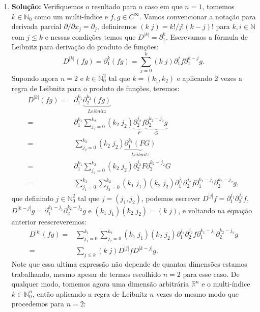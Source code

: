 \documentclass{article}
\begin{document}
\begin{enumerate}
		\item \textbf{Solução:} Verifiquemos o resultado para o caso em que $n =1$, tomemos $k \in \mathbb{N}_{0}$ como um multi-índice e $f, g \in C^{\infty}$. Vamos convencionar a notação para derivada parcial $\partial/\partial {x_{j}} = \partial_{j}$, definiremos $(k \; j) = k!/j!(k-j)!$ para $k, i \in \mathbb{N}$ com $j \leq k$  e nessas condições temos que $D^{|k|} = \partial^{k}_{1}$. Escrevamos a fórmula de Leibnitz para derivação do produto de funções:
		$$
		D^{|k|} (fg)
		= \partial^{k}_{1} (fg) = \sum_{j=0}^{k} (k \; j)\partial_{1}^{j}f \partial_{1}^{k-j}g.
		$$
		Supondo agora $n = 2$ e $k \in \mathbb{N}^{2}_{0}$ tal que $k = (k_{1}, k_{2})$ e aplicando 2 vezes a regra de Leibnitz para o produto de funções, teremos:
		$$
		\begin{aligned}
		D^{|k|} (fg)
		= & \partial^{k_1}_{1} \underbrace{ \partial^{k_2}_{2} (fg) }_{Leibnitz}  \\
		= & \partial^{k_1}_{1} \sum_{j_{2}=0}^{k_{2}} (k_{2} \; j_{2}) \underbrace{ \partial_{2}^{j_{2}}f }_{F} \underbrace{ \partial_{2}^{k_{2}-j_{2}}g }_{G} \\
		= & \sum_{j_{2}=0}^{k_{2}} (k_{2} \; j_{2}) \underbrace{ \partial^{k_1}_{1} (F G) }_{Leibnitz} \\
		= & \partial^{k_1}_{1} \sum_{j_{2}=0}^{k_{2}} (k_{2} \; j_{2}) \partial_{2}^{j_{2}}F \partial_{2}^{k_{2}-j_{2}}G  \\
		= & \sum_{j_{1}=0}^{k_{1}} \sum_{j_{2}=0}^{k_{2}} (k_{1} \; j_{1})(k_{2} \; j_{2}) \partial_{1}^{j_{1}} \partial_{2}^{j_{2}}f \partial_{1}^{k_{1}-j_{1}} \partial_{2}^{k_{2}-j_{2}}g,
		\end{aligned}
		$$
		que definindo $j \in \mathbb{N}^{2}_{0}$ tal que $j = (j_{1}, j_{2})$, podemos escrever $D^{|j|} f = \partial_{1}^{j_{1}} \partial_{2}^{j_{2}}f$, $D^{|k - j|} g = \partial_{1}^{k_{1}-j_{1}} \partial_{2}^{k_{2}-j_{2}}g$ e $(k_{1} \; j_{1})(k_{2} \; j_{2}) = (k \; j)$, e voltando na equação anterior reescreveremos:
		$$
		\begin{aligned}
		D^{|k|} (fg)
		= & \sum_{j_{1}=0}^{k_{1}} \sum_{j_{2}=0}^{k_{2}} (k_{1} \; j_{1})(k_{2} \; j_{2}) \partial_{1}^{j_{1}} \partial_{2}^{j_{2}}f \partial_{1}^{k_{1}-j_{1}} \partial_{2}^{k_{2}-j_{2}}g \\
		= & \sum_{j \leq k} (k \; j) D^{|j|}f D^{|k-j|}g.
		\end{aligned}
		$$
		Note que essa ultima expressão não depende de quantas dimensões estamos trabalhando, mesmo apesar de termos escolhido $n=2$ para esse caso. De qualquer modo, tomemos agora uma dimensão arbitrária $\mathbb{R}^{n}$ e o multi-índice $k \in \mathbb{N}^{n}_{0}$, então aplicando a regra de Leibnitz $n$ vezes do mesmo modo que procedemos para $n=2$:

\end{enumerate}
\end{document}
